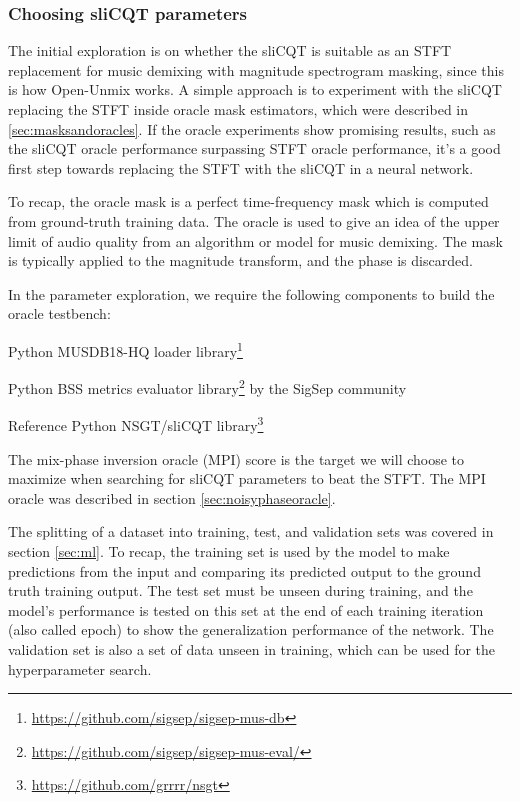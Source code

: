 \documentclass[report.tex]{subfiles}
\begin{document}
\newpagefill

\subsubsection{Choosing sliCQT parameters}
\label{sec:slicqparamsrch}

The initial exploration is on whether the sliCQT is suitable as an STFT replacement for music demixing with magnitude spectrogram masking, since this is how Open-Unmix works. A simple approach is to experiment with the sliCQT replacing the STFT inside oracle mask estimators, which were described in \ref{sec:masksandoracles}. If the oracle experiments show promising results, such as the sliCQT oracle performance surpassing STFT oracle performance, it's a good first step towards replacing the STFT with the sliCQT in a neural network.

To recap, the oracle mask is a perfect time-frequency mask which is computed from ground-truth training data. The oracle is used to give an idea of the upper limit of audio quality from an algorithm or model for music demixing. The mask is typically applied to the magnitude transform, and the phase is discarded.

In the parameter exploration, we require the following components to build the oracle testbench:

\begin{tight_enumerate}
	\item
		Python MUSDB18-HQ loader library\footnote{\url{https://github.com/sigsep/sigsep-mus-db}}
	\item
		Python BSS metrics evaluator library\footnote{\url{https://github.com/sigsep/sigsep-mus-eval/}} by the SigSep community
	\item
		Reference Python NSGT/sliCQT library\footnote{\url{https://github.com/grrrr/nsgt}}
\end{tight_enumerate}

The mix-phase inversion oracle (MPI) score is the target we will choose to maximize when searching for sliCQT parameters to beat the STFT. The MPI oracle was described in section \ref{sec:noisyphaseoracle}.

The splitting of a dataset into training, test, and validation sets was covered in section \ref{sec:ml}. To recap, the training set is used by the model to make predictions from the input and comparing its predicted output to the ground truth training output. The test set must be unseen during training, and the model's performance is tested on this set at the end of each training iteration (also called epoch) to show the generalization performance of the network. The validation set is also a set of data unseen in training, which can be used for the hyperparameter search.
\end{document}
